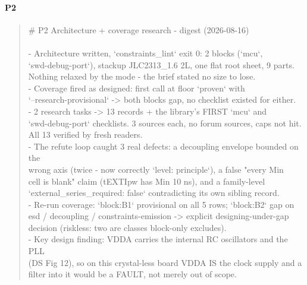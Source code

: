 \documentclass[11pt,a4paper]{article}
\begin{document}
\paragraph*{P2}
\begin{quote}\small\ttfamily\raggedright
\# P2 Architecture + coverage research - digest (2026-08-16)\\
~\\
- Architecture written, `constraints\_lint` exit 0: 2 blocks (`mcu`,\\
  `swd-debug-port`), stackup JLC2313\_1.6 2L, one flat root sheet, 9 parts.\\
  Nothing relaxed by the mode - the brief stated no size to lose.\\
- Coverage fired as designed: first call at floor `proven` with\\
  `--research-provisional` -\textgreater{} both blocks gap, no checklist existed for either.\\
- 2 research tasks -\textgreater{} 13 records + the library's FIRST `mcu` and\\
  `swd-debug-port` checklists. 3 sources each, no forum sources, caps not hit.\\
  All 13 verified by fresh readers.\\
- The refute loop caught 3 real defects: a decoupling envelope bounded on the\\
  wrong axis (twice - now correctly `level: principle`), a false "every Min\\
  cell is blank" claim (tEXTIpw has Min 10 ns), and a family-level\\
  `external\_series\_required: false` contradicting its own sibling record.\\
- Re-run coverage: `block:B1` provisional on all 5 rows; `block:B2` gap on\\
  esd / decoupling / constraints-emission -\textgreater{} explicit designing-under-gap\\
  decision (riskless: two are classes block-only excludes).\\
- Key design finding: VDDA carries the internal RC oscillators and the PLL\\
  (DS Fig 12), so on this crystal-less board VDDA IS the clock supply and a\\
  filter into it would be a FAULT, not merely out of scope.
\end{quote}
\end{document}
